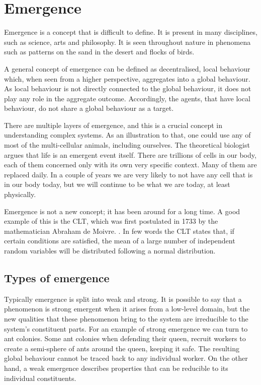 \section{Emergence}

Emergence is a concept that is difficult to define. It is present in many disciplines, such as science, arts and philosophy. It is seen throughout nature in phenomena such as patterns on the sand in the desert and flocks of birds.

A general concept of emergence can be defined as decentralised, local behaviour which, when seen from a higher perspective, aggregates into a global behaviour. As local behaviour is not directly connected to the global behaviour, it does not play any role in the aggregate outcome. Accordingly, the agents, that have local behaviour, do not share a global behaviour as a target.

There are multiple layers of emergence, and this is a crucial concept in understanding complex systems.\cite{miller2007complex} As an illustration to that, one could use any of most of the multi-cellular animals, including ourselves. The theoretical biologist \citeauthor{life1010034} argues that life is an emergent event itself. There are trillions of cells in our body, each of them concerned only with its own very specific context. Many of them are replaced daily. In a couple of years we are very likely to not have any cell that is in our body today, but we will continue to be what we are today, at least physically.

Emergence is not a new concept; it has been around for a long time. A good example of this is the \ac{CLT}, which was first postulated in 1733 by the mathematician Abraham de Moivre. \cite{tijms2007understanding}. In few words the \ac{CLT} states that, if certain conditions are satisfied, the mean of a large number of independent random variables will be distributed following a normal distribution.

\subsection{Types of emergence}

Typically emergence is split into weak and strong. It is possible to say that a phenomenon is strong emergent when it arises from a low-level domain, but the new qualities that these phenomenon bring to the system are irreducible to the system's constituent parts.\cite{laughlin2008different} For an example of strong emergence we can turn to ant colonies. Some ant colonies when defending their queen, recruit workers to create a semi-sphere of ants around the queen, keeping it safe. The resulting global behaviour cannot be traced back to any individual worker. On the other hand, a weak emergence describes properties that can be reducible to its individual constituents. 

